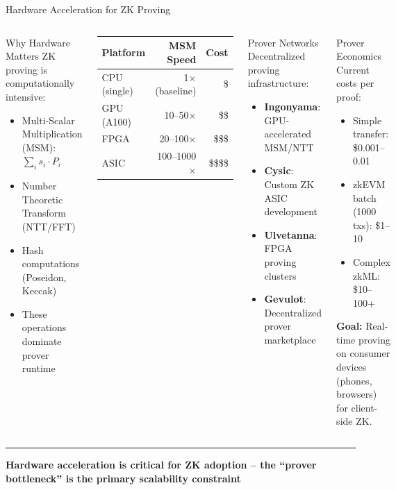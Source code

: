\documentclass[8pt,aspectratio=169]{beamer}
\newcommand{\bottomnote}[1]{\vfill\vspace{-2mm}\textcolor{mllavender2}{\rule{\textwidth}{0.4pt}}\vspace{1mm}\footnotesize\textbf{#1}}
\begin{document}
\begin{frame}{Hardware Acceleration for ZK Proving}
\begin{columns}[T]
\begin{block}{\footnotesize Why Hardware Matters}
\footnotesize
ZK proving is computationally intensive:
\begin{itemize}
\item Multi-Scalar Multiplication (MSM): $\sum_i s_i \cdot P_i$
\item Number Theoretic Transform (NTT/FFT)
\item Hash computations (Poseidon, Keccak)
\item These operations dominate prover runtime
\end{itemize}
\end{block}
\vspace{0.1cm}
\footnotesize
\begin{center}
\begin{tabular}{l r r}
\toprule
\textbf{Platform} & \textbf{MSM Speed} & \textbf{Cost} \\
\midrule
CPU (single) & 1$\times$ (baseline) & \$ \\
GPU (A100) & 10--50$\times$ & \$\$ \\
FPGA & 20--100$\times$ & \$\$\$ \\
ASIC & 100--1000$\times$ & \$\$\$\$ \\
\bottomrule
\end{tabular}
\end{center}
\begin{block}{\footnotesize Prover Networks}
\footnotesize
Decentralized proving infrastructure:
\begin{itemize}
\item \textbf{Ingonyama}: GPU-accelerated MSM/NTT
\item \textbf{Cysic}: Custom ZK ASIC development
\item \textbf{Ulvetanna}: FPGA proving clusters
\item \textbf{Gevulot}: Decentralized prover marketplace
\end{itemize}
\end{block}
\vspace{0.1cm}
\begin{alertblock}{\footnotesize Prover Economics}
\footnotesize
Current costs per proof:
\begin{itemize}
\item Simple transfer: \$0.001--0.01
\item zkEVM batch (1000 txs): \$1--10
\item Complex zkML: \$10--100+
\end{itemize}
\textbf{Goal:} Real-time proving on consumer devices (phones, browsers) for client-side ZK.
\end{alertblock}
\end{columns}
\bottomnote{Hardware acceleration is critical for ZK adoption -- the ``prover bottleneck'' is the primary scalability constraint}
\end{frame}
\end{document}
